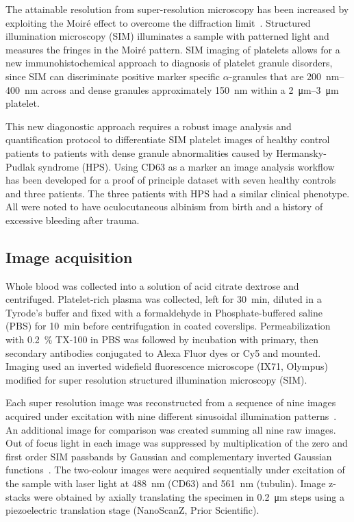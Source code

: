The attainable resolution from super-resolution microscopy has been increased by exploiting the Moir\'e effect to overcome the diffraction limit~\cite{Gustafsson2005}. Structured illumination microscopy (SIM) illuminates a sample with patterned light and measures the fringes in the Moir\'e pattern. SIM imaging of platelets allows for a new immunohistochemical approach to diagnosis of platelet granule disorders, since SIM can discriminate positive marker specific $\alpha$-granules that are \SIrange{200}{400}{\nano\meter} across and dense granules approximately \SI{150}{\nano\meter} within a \SIrange{2}{3}{\micro\meter} platelet.

This new diagonostic approach requires a robust image analysis and quantification protocol to differentiate SIM platelet images of healthy control patients to patients with dense granule abnormalities caused by Hermansky-Pudlak syndrome (HPS). Using CD63 as a marker an image analysis workflow has been developed for a proof of principle dataset with seven healthy controls and three patients. The three patients with HPS had a similar clinical phenotype. All were noted to have oculocutaneous albinism from birth and a history of excessive bleeding after trauma.

\subsection{Image acquisition}
Whole blood was collected into a solution of acid citrate dextrose and centrifuged. Platelet-rich plasma was collected, left for \SI{30}{\minute}, diluted in a Tyrode’s buffer and fixed with a formaldehyde in Phosphate-buffered saline (PBS) for \SI{10}{\minute} before  centrifugation in coated coverslips. Permeabilization with \SI{0.2}{\percent} TX-100 in PBS was followed by incubation with primary, then secondary antibodies conjugated to Alexa Fluor dyes or Cy5 and mounted. Imaging used an inverted widefield fluorescence microscope (IX71, Olympus) modified for super resolution structured illumination microscopy (SIM). 

Each super resolution image was reconstructed from a sequence of nine images acquired under excitation with nine different sinusoidal illumination patterns~\cite{Gustafsson2008}. An additional image for comparison was created summing all nine raw images. Out of focus light in each image was suppressed by multiplication of the zero and first order SIM passbands by Gaussian and complementary inverted Gaussian functions~\cite{Holleran2014}. The two-colour images were acquired sequentially under excitation of the sample with laser light at \SI{488}{\nano\meter} (CD63) and \SI{561}{\nano\meter} (tubulin). Image z-stacks were obtained by axially translating the specimen in \SI{0.2}{\micro\meter} steps using a piezoelectric translation stage (NanoScanZ, Prior Scientific).

